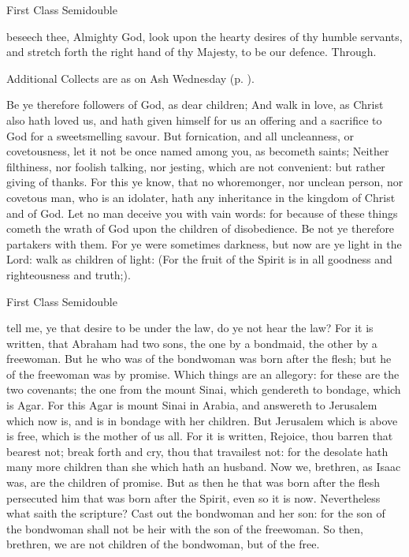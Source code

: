 \begin{inhead}
{First Class Semidouble}
\end{inhead}

\collect
{} beseech thee, Almighty God, look upon the hearty desires of thy humble servants, and stretch forth the right hand of thy Majesty, to be our defence. Through.
\begin{rubric}
    Additional Collects are as on Ash Wednesday (p. \pageref{AshWednesdayMass}).
\end{rubric}

 Be ye therefore followers of God, as dear children; And walk in love, as Christ also hath loved us, and hath given himself for us an offering and a sacrifice to God for a sweetsmelling savour. But fornication, and all uncleanness, or covetousness, let it not be once named among you, as becometh saints; Neither filthiness, nor foolish talking, nor jesting, which are not convenient: but rather giving of thanks. For this ye know, that no whoremonger, nor unclean person, nor covetous man, who is an idolater, hath any inheritance in the kingdom of Christ and of God. Let no man deceive you with vain words: for because of these things cometh the wrath of God upon the children of disobedience. Be not ye therefore partakers with them. For ye were sometimes darkness, but now are ye light in the Lord: walk as children of light: (For the fruit of the Spirit is in all goodness and righteousness and truth;).


\begin{inhead}
{First Class Semidouble}
\end{inhead}

 tell me, ye that desire to be under the law, do ye not hear the law? For it is written, that Abraham had two sons, the one by a bondmaid, the other by a freewoman. But he who was of the bondwoman was born after the flesh; but he of the freewoman was by promise. Which things are an allegory: for these are the two covenants; the one from the mount Sinai, which gendereth to bondage, which is Agar. For this Agar is mount Sinai in Arabia, and answereth to Jerusalem which now is, and is in bondage with her children. But Jerusalem which is above is free, which is the mother of us all. For it is written, Rejoice, thou barren that bearest not; break forth and cry, thou that travailest not: for the desolate hath many more children than she which hath an husband. Now we, brethren, as Isaac was, are the children of promise. But as then he that was born after the flesh persecuted him that was born after the Spirit, even so it is now. Nevertheless what saith the scripture? Cast out the bondwoman and her son: for the son of the bondwoman shall not be heir with the son of the freewoman. So then, brethren, we are not children of the bondwoman, but of the free.

